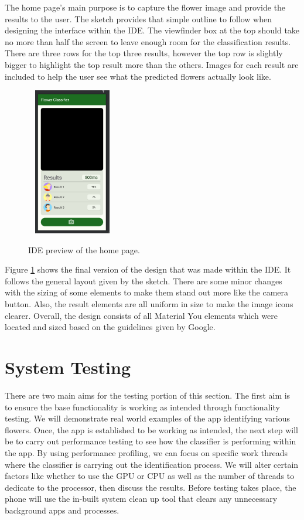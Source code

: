 \documentclass[12pt,a4paper]{report}
\begin{document}
The home page's main purpose is to capture the flower image and provide the results to the user. The sketch provides 
that simple outline to follow when designing the interface within the IDE. The viewfinder box at the top should take no 
more than half the screen to leave enough room for the classification results. There are three rows for the top three 
results, however the top row is slightly bigger to highlight the top result more than the others. Images for each result
are included to help the user see what the predicted flowers actually look like.

\begin{figure}[h]\
    \centering
    \includegraphics[width=0.3\textwidth]{IDE_Ver.png}
    \caption{IDE preview of the home page.}
    \label{fig:final_des}
\end{figure}

\break

Figure \ref{fig:final_des} shows the final version of the design that was made within the IDE. It follows the general 
layout given by 
the sketch. There are some minor changes with the sizing of some elements to make them stand out more like the camera 
button. Also, the result elements are all uniform in size to make the image icons clearer. Overall, the design consists 
of all Material You elements which were located and sized based on the guidelines given by Google. 


\section{System Testing}

There are two main aims for the testing portion of this section. The first aim is to ensure the base 
functionality is working as intended through functionality testing. We will demonstrate real world examples of the app 
identifying various flowers. Once, the app is established to be working as intended, the next step will be to carry out 
performance testing to see how the classifier is performing within the app. By using performance profiling, we can focus
on specific work threads where the classifier is carrying out the identification process. We will alter certain factors 
like whether to use the GPU or CPU as well as the number of threads to dedicate to the processor, then discuss the 
results. Before testing takes place, the phone will use the in-built system clean up tool that clears any unnecessary 
background apps and processes.
\end{document}
